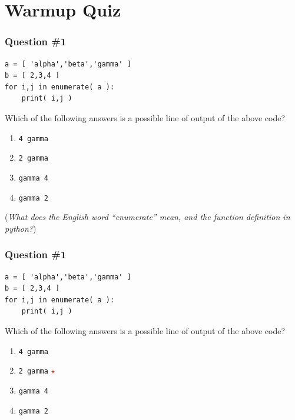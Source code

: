 \documentclass[11pt]{beamer}
\newcommand{\correctstar}{\textcolor{red}{$\star$}}
\begin{document}
\fi

\section{Warmup Quiz}

\begin{frame}[fragile]
  \frametitle{Question \#1}
  \Enlarge

  \begin{Verbatim}
a = [ 'alpha','beta','gamma' ]
b = [ 2,3,4 ]
for i,j in enumerate( a ):
    print( i,j )
  \end{Verbatim}

  Which of the following answers is a possible line of output of the above code?

  \begin{enumerate}[label=\Alph*]
  \item  \texttt{4 gamma}
  \item  \texttt{2 gamma}
  \item  \texttt{gamma 4}
  \item  \texttt{gamma 2}
  \end{enumerate}
  
  (\emph{What does the English word ``enumerate'' mean, and the function definition in python?})
\end{frame}

\begin{frame}[fragile]
  \frametitle{Question \#1}
  \Enlarge

  \begin{Verbatim}
a = [ 'alpha','beta','gamma' ]
b = [ 2,3,4 ]
for i,j in enumerate( a ):
    print( i,j )
  \end{Verbatim}

  Which of the following answers is a possible line of output of the above code?

  \begin{enumerate}[label=\Alph*]
  \item  \texttt{4 gamma}
  \item  \texttt{2 gamma}  \correctstar
  \item  \texttt{gamma 4}
  \item  \texttt{gamma 2}
  \end{enumerate}
  
\end{frame}
\end{document}
